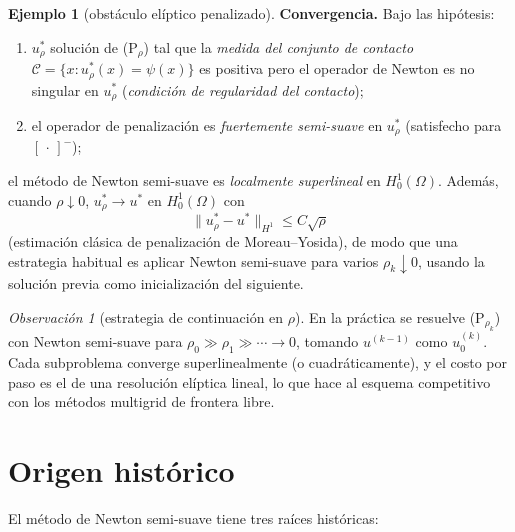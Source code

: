 \documentclass[12pt]{book}
\theoremstyle{definition}
\newtheorem{ejemplo}{Ejemplo}[section]
\theoremstyle{plain}
\theoremstyle{remark}
\newtheorem{observacion}{Observación}[section]
\begin{document}
\begin{ejemplo}[obstáculo elíptico penalizado]
  \medskip
  \textbf{Convergencia.}  Bajo las hipótesis:
  \begin{enumerate}[label=\textup{(\roman*)},leftmargin=1.6em,itemsep=1pt]
    \item $u^*_\rho$ solución de (P$_\rho$) tal que la
          \emph{medida del conjunto de contacto}
          $\mathcal{C}=\{x:u^*_\rho(x)=\psi(x)\}$ es positiva pero
          el operador de Newton es no singular en $u^*_\rho$
          (\emph{condición de regularidad del contacto});
    \item el operador de penalización es \emph{fuertemente
          semi-suave} en $u^*_\rho$ (satisfecho para $[\,\cdot\,]^-$);
  \end{enumerate}
  el método de Newton semi-suave es \emph{localmente
  superlineal} en $H^1_0(\Omega)$.  Además, cuando
  $\rho\downarrow0$, $u^*_\rho\to u^*$ en $H^1_0(\Omega)$ con
  \[
    \|u^*_\rho-u^*\|_{H^1} \le C\sqrt{\rho}
  \]
  (estimación clásica de penalización de Moreau--Yosida), de modo
  que una estrategia habitual es aplicar Newton semi-suave para
  varios $\rho_k\downarrow0$, usando la solución previa como
  inicialización del siguiente.
\end{ejemplo}

\begin{observacion}[estrategia de continuación en $\rho$]
  En la práctica se resuelve (P$_{\rho_k}$) con Newton semi-suave
  para $\rho_0\gg\rho_1\gg\cdots\to0$, tomando $u^{(k-1)}$ como
  $u_0^{(k)}$.  Cada subproblema converge superlinealmente (o
  cuadráticamente), y el costo por paso es el de una resolución
  elíptica lineal, lo que hace al esquema competitivo con los
  métodos multigrid de frontera libre.
\end{observacion}

\section{Origen histórico}\label{sec:origen}

El método de Newton semi-suave tiene tres raíces históricas:
\end{document}
